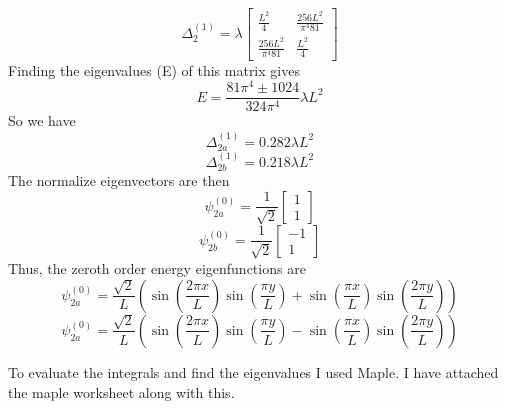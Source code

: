 \documentclass[12pt]{article}
\begin{document}
$$ \Delta_2^{(1)} = \lambda \begin{bmatrix}
    \frac{L^2}{4} & \frac{256 L^2 }{\pi^4 81} \\
    \frac{256 L^2 }{\pi^4 81} & \frac{L^2}{4} 
\end{bmatrix} $$
Finding the eigenvalues  (E) of this matrix gives 
$$ E = \frac{81 \pi^4 \pm 1024}{324 \pi^4} \lambda L^2 $$
So we have 
$$ \Delta_{2a}^{(1)} = 0.282 \lambda L^2 $$
$$ \Delta_{2b}^{(1)} = 0.218 \lambda L^2 $$
The normalize eigenvectors are then 
$$ \psi_{2a}^{(0)} = \frac{1}{\sqrt{2}} \begin{bmatrix}
    1 \\ 1 
\end{bmatrix} $$
$$ \psi_{2b}^{(0)} = \frac{1}{\sqrt{2}} \begin{bmatrix}
    -1 \\ 1 
\end{bmatrix} $$
Thus, the zeroth order energy eigenfunctions are 
$$ \psi_{2a}^{(0)} = \frac{\sqrt{2}}{L} ( \sin (\frac{ 2 \pi x}{L } ) \sin (\frac{\pi y}{L}) + \sin (\frac{\pi x}{L} ) \sin (\frac{2 \pi y }{L}) ) $$
$$ \psi_{2a}^{(0)} = \frac{\sqrt{2}}{L} ( \sin (\frac{ 2 \pi x}{L } ) \sin (\frac{\pi y}{L}) - \sin (\frac{\pi x}{L} ) \sin (\frac{2 \pi y }{L}) ) $$


To evaluate the integrals and find the eigenvalues I used Maple. I have attached the maple worksheet along with this. 
\end{document}
